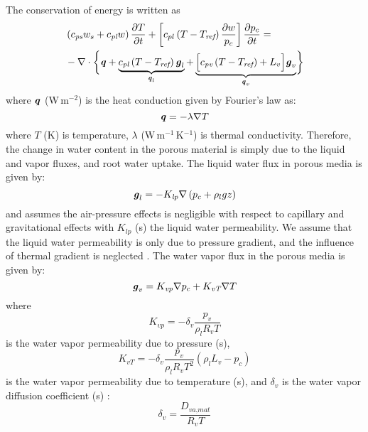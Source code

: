 The conservation of energy is written as  
\begin{equation}
\begin{split}
&\left(c_{\textit{ps}} w_s + c_{\textit{pl}} w\right)\frac{\partial T}{\partial t} + \left[c_{pl} \left(T - T_{\textit{ref}}\right) \frac{\partial w}{p_c}\right]\frac{\partial p_c}{\partial t} =\\
& - \nabla \cdot \bigg\{ {\textbf{\textit{q}} + \underbrace{ c_{\textit{pl}} \left(T - T_{\textit{ref}}\right)\textbf{\textit{g}}_l}_{\textbf{\textit{q}}_l} + \underbrace{ \Big[c_{\textit{pv}} \left(T - T_{\textit{ref}}\right) + L_v\Big]\textbf{\textit{g}}_v}_{\textbf{\textit{q}}_v} } \bigg\}
\end{split}
\end{equation}
where $\textbf{\textit{q}}$ (W\,m$^{-2}$) is the heat conduction given by Fourier's law as:
\begin{equation}
\textbf{\textit{q}} = -\lambda \nabla T
\end{equation}
where $T$ (K) is temperature, $\lambda$ (W\,m$^{-1}$\,K$^{-1}$) is thermal conductivity. Therefore, the change in water content in the porous material is simply due to the liquid and vapor fluxes, and root water uptake. The liquid water flux in porous media is given by:
\begin{equation}
\textbf{\textit{g}}_l = - K_{\textit{lp}} \nabla \left(p_c + \rho_l g z\right)
\end{equation}
and assumes the air-pressure effects is negligible with respect to capillary and gravitational effects with $K_{\textit{lp}}$ (s) the liquid water permeability. We assume that the liquid water permeability is only due to pressure gradient, and the influence of thermal gradient is neglected \citep{Carmeliet2005}. The water vapor flux in the porous media is given by:
\begin{equation}
	\textbf{\textit{g}}_v = K_{\textit{vp}}\nabla p_c + K_{\textit{vT}}\nabla T
\end{equation}
where
\begin{equation}
	K_{\textit{vp}} = - \delta_v \frac{p_v}{\rho_l R_v T}
\end{equation}
is the water vapor permeability due to pressure (s), 
\begin{equation}
	K_{\textit{vT}} = - \delta_v \frac{p_v}{\rho_l R_v T^2}\left(\rho_l L_v - p_c\right)
\end{equation}
is the water vapor permeability due to temperature (s), and $\delta_v$ is the water vapor diffusion coefficient (s) \citep{Carmeliet2005, Defraeye2011, Saneinejad2013, Kubilay2014b}:
\begin{equation}
\delta_v = \frac{D_{\textit{va,mat}}}{R_v T}
\end{equation}

